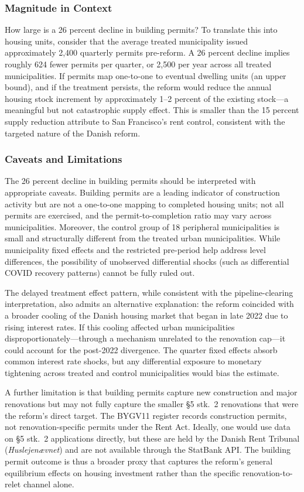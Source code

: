 \documentclass[12pt]{article}
\begin{document}
\subsubsection*{Magnitude in Context} How large is a 26 percent decline in building permits? To translate this into housing units, consider that the average treated municipality issued approximately 2,400 quarterly permits pre-reform. A 26 percent decline implies roughly 624 fewer permits per quarter, or 2,500 per year across all treated municipalities. If permits map one-to-one to eventual dwelling units (an upper bound), and if the treatment persists, the reform would reduce the annual housing stock increment by approximately 1--2 percent of the existing stock---a meaningful but not catastrophic supply effect. This is smaller than the 15 percent supply reduction \citet{diamond2019} attribute to San Francisco's rent control, consistent with the targeted nature of the Danish reform.

\subsubsection*{Caveats and Limitations} The 26 percent decline in building permits should be interpreted with appropriate caveats. Building permits are a leading indicator of construction activity but are not a one-to-one mapping to completed housing units; not all permits are exercised, and the permit-to-completion ratio may vary across municipalities. Moreover, the control group of 18 peripheral municipalities is small and structurally different from the treated urban municipalities. While municipality fixed effects and the restricted pre-period help address level differences, the possibility of unobserved differential shocks (such as differential COVID recovery patterns) cannot be fully ruled out.

The delayed treatment effect pattern, while consistent with the pipeline-clearing interpretation, also admits an alternative explanation: the reform coincided with a broader cooling of the Danish housing market that began in late 2022 due to rising interest rates. If this cooling affected urban municipalities disproportionately---through a mechanism unrelated to the renovation cap---it could account for the post-2022 divergence. The quarter fixed effects absorb common interest rate shocks, but any differential exposure to monetary tightening across treated and control municipalities would bias the estimate.

A further limitation is that building permits capture new construction and major renovations but may not fully capture the smaller \S5 stk.\ 2 renovations that were the reform's direct target. The BYGV11 register records construction permits, not renovation-specific permits under the Rent Act. Ideally, one would use data on \S5 stk.\ 2 applications directly, but these are held by the Danish Rent Tribunal (\emph{Huslejen{\ae}vnet}) and are not available through the StatBank API. The building permit outcome is thus a broader proxy that captures the reform's general equilibrium effects on housing investment rather than the specific renovation-to-relet channel alone.
\end{document}
